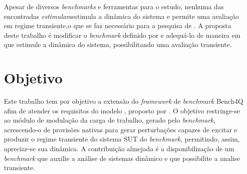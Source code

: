 Apesar de  diversos \textit{benchmarks} e ferramentas para o estudo, nenhuma das encontradas \emph{estimulam}{estimula} a dinâmica do sistema e permite uma avaliação em regime transiente,o  que se faz necessário para a pesquisa de . A proposta deste trabalho é modificar o \textit{benchmark} definido por  e adequá-lo de maneira em que estimule a dinâmica do sistema, possibilitando uma avaliação transiente.

\section{Objetivo}
Este trabalho tem por objetivo a extensão do \textit{framework} de \textit{benchmark} Bench4Q afim de atender os requisitos do modelo \textit{}, proposto por . O objetivo restringe-se ao módulo de modulação da carga de trabalho, gerado pelo \textit{benchmark}, acrescendo-o de provisões nativas para gerar perturbações capazes de excitar e produzir o regime transiente do sistema SUT do \textit{benchmark}, permitindo, assim, apreciar-se sua dinâmica. A contribuição almejada é a disponibilização de um \textit{benchmark} que auxilie a análise de sistemas dinâmico e que possibilite a analise transiente.


